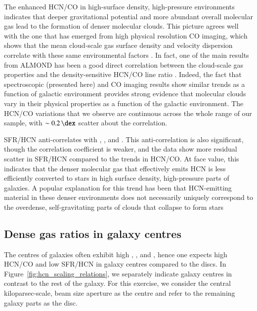 \documentclass[letter, longauth]{aa} %
\begin{document}
The enhanced HCN/CO in high-surface density, high-pressure environments indicates that deeper gravitational potential and more abundant overall molecular gas lead to the formation of denser molecular clouds. 
This picture agrees well with the one that has emerged from high physical resolution CO imaging, which shows that the mean cloud-scale gas surface density and velocity dispersion correlate with these same environmental factors \citep[][]{Sun2022}. 
In fact, one of the main results from ALMOND has been a good direct correlation between the cloud-scale gas properties and the density-sensitive HCN/CO line ratio \citep{Neumann2023a}. 
Indeed, the fact that spectroscopic (presented here) and CO imaging results show similar trends as a function of galactic environment provides strong evidence that molecular clouds vary in their physical properties as a function of the galactic environment. 
The HCN/CO variations that we observe are continuous across the whole range of our sample, with $\sim\SI{0.2}{\dex}$ scatter about the correlation.

SFR/HCN anti-correlates with \sigstar, \sigmol, and \pde. 
This anti-correlation is also significant, though the correlation coefficient is weaker, and the data show more residual scatter in SFR/HCN compared to the trends in HCN/CO. 
At face value, this indicates that the denser molecular gas that effectively emits HCN is less efficiently converted to stars in high surface density, high-pressure parts of galaxies. 
A popular explanation for this trend has been that HCN-emitting material in these denser environments does not necessarily uniquely correspond to the overdense, self-gravitating parts of clouds that collapse to form stars \citep[e.g.][]{Krumholz2007, Shetty2014, Gallagher2018b, Neumann2023a, Bemis2023, Bemis2024}

\subsection{Dense gas ratios in galaxy centres}
\label{sec:centres}

The centres of galaxies often exhibit high \sigmol, \sigstar, and \pde, hence one expects high HCN/CO and low SFR/HCN in galaxy centres compared to the discs. 
In Figure~\ref{fig:hcn_scaling_relations}, we separately indicate galaxy centres in contrast to the rest of the galaxy.
For this exercise, we consider the central kiloparsec-scale, beam size aperture as the centre and refer to the remaining galaxy parts as the disc.
\end{document}

